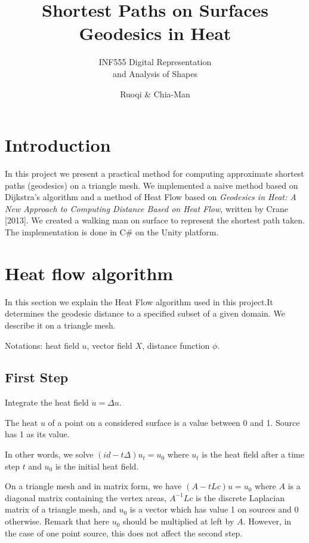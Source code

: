 \documentclass[a4paper,12pt,twoside]{article}
\title{Shortest Paths on Surfaces\\ Geodesics in Heat}
\subtitle{INF555 Digital Representation\\ and Analysis of Shapes }
\author{Ruoqi \bsc{He} \& Chia-Man \bsc{Hung}}
\begin{document}
\maketitle

\section{Introduction}

In this project we present a practical method for computing approximate shortest paths (geodesics) on a triangle mesh. We implemented a naive method based on Dijkstra's algorithm and a method of Heat Flow based on \textit{Geodesics in Heat: A New Approach to Computing Distance Based on Heat Flow}, written by Crane [2013]. We created a walking man on surface to represent the shortest path taken. The implementation is done in C\# on the Unity platform.

\section{Heat flow algorithm}

In this section we explain the Heat Flow algorithm used in this project.It determines the geodesic distance to a specified subset of a given domain. We describe it on a triangle mesh.

Notations: heat field $u$, vector field $X$, distance function $\phi$.

\subsection{First Step}
Integrate the heat field $\dot{u} = \Delta u$.

The heat $u$ of a point on a considered surface is a value between 0 and 1. Source has 1 as its value.

In other words, we solve $(id - t\Delta)u_t = u_0$ where $u_t$ is the heat field after a time step $t$ and $u_0$ is the initial heat field.

On a triangle mesh and in matrix form, we have $(A - tLc)u = u_0$ where $A$ is a diagonal matrix containing the vertex areas, $A^{-1}Lc$ is the discrete Laplacian matrix of a triangle mesh, and $u_0$ is a vector which has value 1 on sources and 0 otherwise. Remark that here $u_0$ should be multiplied at left by $A$. However, in the case of one point source, this does not affect the second step.
\end{document}
